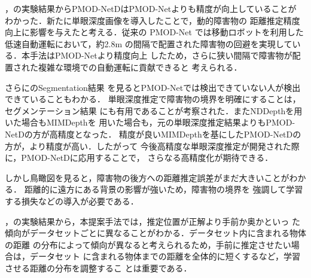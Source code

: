 ，の実験結果からPMOD-NetDはPMOD-Netよりも精度が向上していることが
わかった．新たに単眼深度画像を導入したことで，動的障害物の
距離推定精度向上に影響を与えたと考える．従来の PMOD-Net
では移動ロボットを利用した低速自動運転において，約2.8m
の間隔で配置された障害物の回避を実現している\cite{3}．本手法はPMOD-Netより精度向上
したため，さらに狭い間隔で障害物が配置された複雑な環境での自動運転に貢献できると
考えられる．

さらにのSegmentation結果
を見るとPMOD-Netでは検出できていない人が検出できていることもわかる．
単眼深度推定で障害物の境界を明確にすることは，セグメンテーション結果
にも有用であることが考察された．またNDDepthを用いた場合もMIMDepthを
用いた場合も，元の単眼深度推定結果よりもPMOD-NetDの方が高精度となった．
精度が良いMIMDepthを基にしたPMOD-NetDの方が，より精度が高い．したがって
今後高精度な単眼深度推定が開発された際に，PMOD-NetDに応用することで，
さらなる高精度化が期待できる．

しかし鳥瞰図を見ると，障害物の後方への距離推定誤差がまだ大きいことがわかる．
距離的に遠方にある背景の影響が強いため，障害物の境界を
強調して学習する損失などの導入が必要である．

，の実験結果から，本提案手法では，推定位置が正解より手前か奥かといっ
た傾向がデータセットごとに異なることがわかる．データセット内に含まれる物体の距離
の分布によって傾向が異なると考えられるため，手前に推定させたい場合は，データセット
に含まれる物体までの距離を全体的に短くするなど，学習させる距離の分布を調整するこ
とは重要である．


